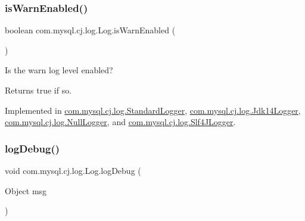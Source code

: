 \mbox{\label{interfacecom_1_1mysql_1_1cj_1_1log_1_1_log_a7877db04f22a78b801a8f2f8989d7043}} 
\subsubsection{\texorpdfstring{is\+Warn\+Enabled()}{isWarnEnabled()}}
{\footnotesize\ttfamily boolean com.\+mysql.\+cj.\+log.\+Log.\+is\+Warn\+Enabled (\begin{DoxyParamCaption}{ }\end{DoxyParamCaption})}

Is the \textquotesingle{}warn\textquotesingle{} log level enabled?

\begin{DoxyReturn}{Returns}
true if so. 
\end{DoxyReturn}


Implemented in \mbox{\hyperlink{classcom_1_1mysql_1_1cj_1_1log_1_1_standard_logger_aad87d184634e72518bbc1a162fb06200}{com.\+mysql.\+cj.\+log.\+Standard\+Logger}}, \mbox{\hyperlink{classcom_1_1mysql_1_1cj_1_1log_1_1_jdk14_logger_a878077a85d6821f2b7ba2eca93e9e01d}{com.\+mysql.\+cj.\+log.\+Jdk14\+Logger}}, \mbox{\hyperlink{classcom_1_1mysql_1_1cj_1_1log_1_1_null_logger_ae2749400e4e820f091a583795111f5a7}{com.\+mysql.\+cj.\+log.\+Null\+Logger}}, and \mbox{\hyperlink{classcom_1_1mysql_1_1cj_1_1log_1_1_slf4_j_logger_aaf12f87af0d37c01118649ba65220a69}{com.\+mysql.\+cj.\+log.\+Slf4\+J\+Logger}}.

\mbox{\label{interfacecom_1_1mysql_1_1cj_1_1log_1_1_log_a6149f715730ea0615ef6e341dd3e8a39}} 
\subsubsection{\texorpdfstring{log\+Debug()}{logDebug()}\hspace{0.1cm}{\footnotesize\ttfamily [1/2]}}
{\footnotesize\ttfamily void com.\+mysql.\+cj.\+log.\+Log.\+log\+Debug (\begin{DoxyParamCaption}\item[{Object}]{msg }\end{DoxyParamCaption})}

